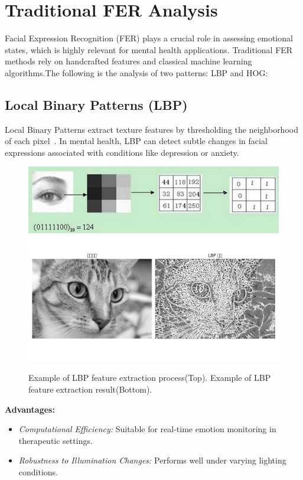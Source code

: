 \documentclass[lettersize,journal]{IEEEtran}
\begin{document}
\section{Traditional FER Analysis}
\label{sec:traditional_fer}

Facial Expression Recognition (FER) plays a crucial role in assessing emotional states, which is highly relevant for mental health applications. Traditional FER methods rely on handcrafted features and classical machine learning algorithms.The following is the analysis of two patterns: LBP and HOG:





\subsection{Local Binary Patterns (LBP)}

Local Binary Patterns extract texture features by thresholding the neighborhood of each pixel~\cite{Ojala2002}. In mental health, LBP can detect subtle changes in facial expressions associated with conditions like depression or anxiety.

\begin{figure}[htbp]
    \centering
    \includegraphics[width=0.7\linewidth]{Traditional FER/LBP_process.png} \\
    \includegraphics[width=0.7\linewidth]{Traditional FER/LBP_result.png}
    \caption{Example of LBP feature extraction process(Top).  Example of LBP feature extraction result(Bottom)\cite{van2014scikit}.}
    \label{fig:lbp_combined}
\end{figure}

\textbf{Advantages:}
\begin{itemize}
    \item \emph{Computational Efficiency:} Suitable for real-time emotion monitoring in therapeutic settings.
    \item \emph{Robustness to Illumination Changes:} Performs well under varying lighting conditions.
\end{itemize}
\end{document}
